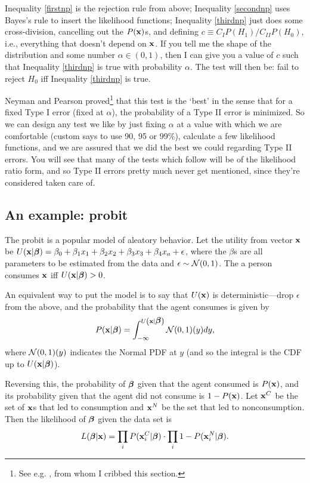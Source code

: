 Inequality \ref{firstnp} is the rejection rule from above; Inequality
\ref{secondnp} uses Bayes's rule to insert the likelihood functions;
Inequality \ref{thirdnp} just does some cross-division, cancelling out the
$P({\bf x})$s, and defining $c\equiv C_IP(H_1)/C_{II}P(H_0)$, i.e., everything
that doesn't depend on ${\bf x}$. If you tell me the shape of the distribution
and some number $\alpha\in(0,1)$, then I can give you a value of $c$
such that Inequality \ref{thirdnp} is true with probability
$\alpha$. The test will then be: fail to reject $H_0$ iff Inequality
\ref{thirdnp} is true.

Neyman and Pearson proved\footnote{See
e.g. \cite[189--191]{amemiya:ez}, from whom I cribbed
this section.}  that this test is the `best' in the sense that for a
fixed Type I error (fixed at $\alpha$), the probability of a Type II
error is minimized. So we can design any test we like by just fixing $\alpha$
at a value with which we are comfortable (custom says to use
90, 95 or 99\%), calculate a few likelihood functions, and we are assured
that we did the best we could regarding Type II errors. You will see that
many of the tests which follow will be of the likelihood ratio form,
and so Type II errors pretty much never get mentioned, since they're
considered taken care of.




\subsection{An example: probit} 
The probit is a popular model of aleatory behavior. 
Let the utility from vector ${\bf x}$ be 
$U({\bf x}|{\mbox{\boldmath$\beta$}}) = \beta_0 + \beta_1 x_1 + \beta_2 x_2 + \beta_3 x_3 + \beta_4 x_a + \epsilon$,
where the $\beta$s are all parameters to be estimated from
the data and $\epsilon \sim {\cal N}(0,1)$.
The a person consumes ${\bf x}$ iff $U({\bf x}|{\mbox{\boldmath$\beta$}})>0$. 

An equivalent way to put the model is to say that $U({\bf x})$ is
deterministic---drop $\epsilon$ from the above, and the probability that
the agent consumes is given by
$$P({\bf x}|{\mbox{\boldmath$\beta$}}) = \int_{-\infty}^{U\left({\bf x}|{\mbox{\boldmath$\beta$}}\right)} {\cal N}(0,1)(y) dy,$$
where ${\cal N}(0,1)(y)$ indicates the Normal PDF at $y$ (and so the
integral is the CDF up to $U({\bf x}|{\mbox{\boldmath$\beta$}})$).

Reversing this, the probability of ${\mbox{\boldmath$\beta$}}$ given that the agent
consumed is $P({\bf x})$, and its probability given that the agent did not
consume is $1-P({\bf x})$. Let ${\bf x}^C$ be the set of ${\bf x}$s that led to
consumption and ${\bf x}^N$ be the set that led to nonconsumption. Then the
likelihood of ${\mbox{\boldmath$\beta$}}$ given the data set is 
$$L({\mbox{\boldmath$\beta$}}|{\bf x}) = \prod_{i} P({\bf x}^C_i|{\mbox{\boldmath$\beta$}}) \cdot \prod_{i} 1-P({\bf x}^N_i|{\mbox{\boldmath$\beta$}}).$$ 

